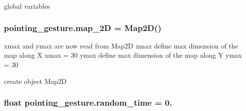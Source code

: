 global variables 

\subsubsection[{\texorpdfstring{map\+\_\+2D}{map_2D}}]{\setlength{\rightskip}{0pt plus 5cm}pointing\+\_\+gesture.\+map\+\_\+2D = {\bf Map2D}()}\hypertarget{namespacepointing__gesture_a08e4083045796d171c79d2538f1b9948}{}\label{namespacepointing__gesture_a08e4083045796d171c79d2538f1b9948}


xmax and ymax are now read from Map2D xmax define max dimension of the map along X xmax = 30 ymax define max dimension of the map along Y ymax = 30 

create object Map2D 
\subsubsection[{\texorpdfstring{random\+\_\+time}{random_time}}]{\setlength{\rightskip}{0pt plus 5cm}float pointing\+\_\+gesture.\+random\+\_\+time = 0.}\hypertarget{namespacepointing__gesture_a5368d56de06c11e03076a319bb31d276}{}\label{namespacepointing__gesture_a5368d56de06c11e03076a319bb31d276}
